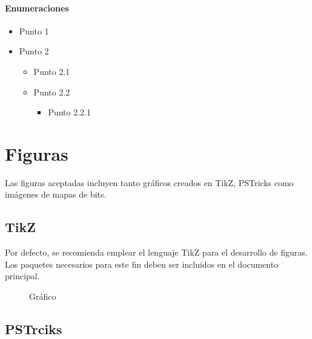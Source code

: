 \documentclass{aleph-revista}
\begin{document}
\paragraph{Enumeraciones}
\begin{itemize}
    \item Punto 1
    \item Punto 2 \begin{itemize}
        \item Punto 2.1
        \item Punto 2.2 \begin{itemize}
            \item Punto 2.2.1
        \end{itemize}
    \end{itemize}
\end{itemize}


\section{Figuras}

Las figuras aceptadas incluyen tanto gráficos creados en TikZ, PSTricks como imágenes de mapas de bits.

\subsection{TikZ}

Por defecto, se recomienda emplear el lenguaje TikZ para el desarrollo de figuras. Los paquetes necesarios para este fin deben ser incluidos en el documento principal.

\begin{figure}[H]
    \centering
    \caption{Gráfico}
    \label{fig:grafico2}
\end{figure}

\subsection{PSTrciks}
\end{document}
